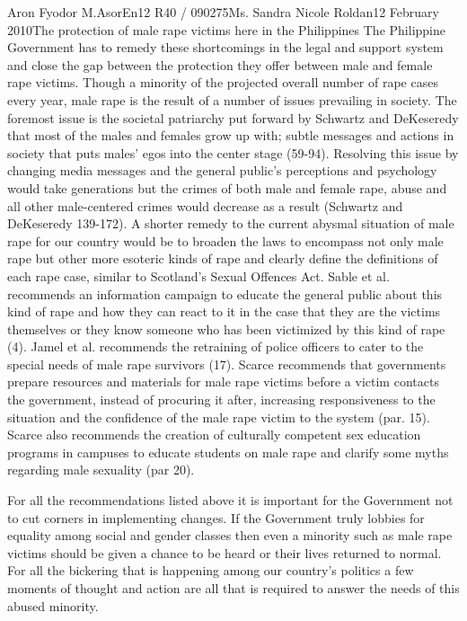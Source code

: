 \documentclass[12pt,letterpaper]{article}
\begin{document}
\begin{mla}{Aron Fyodor M.}{Asor}{En12 R40 / 090275}{Ms. Sandra Nicole Roldan}{12 February 2010}{The protection of male rape victims here in the Philippines}
\tab The Philippine Government has to remedy these shortcomings in the legal and support system and close the gap between the protection they offer between male and female rape victims. Though a minority of the projected overall number of rape cases every year, male rape is the result of a number of issues prevailing in society. The foremost issue is the societal patriarchy put forward by Schwartz and DeKeseredy that most of the males and females grow up with; subtle messages and actions in society that puts males' egos into the center stage (59-94). Resolving this issue by changing media messages and the general public's perceptions and psychology would take generations but the crimes of both male and female rape, abuse and all other male-centered crimes would decrease as a result (Schwartz and DeKeseredy 139-172). A shorter remedy to the current abysmal situation of male rape for our country would be to broaden the laws to encompass not only male rape but other more esoteric kinds of rape and clearly define the definitions of each rape case, similar to Scotland's Sexual Offences Act. Sable et al. recommends an information campaign to educate the general public about this kind of rape and how they can react to it in the case that they are the victims themselves or they know someone who has been victimized by this kind of rape (4). Jamel et al. recommends the retraining of police officers to cater to the special needs of male rape survivors (17). Scarce recommends that governments prepare resources and materials for male rape victims before a victim contacts the government, instead of procuring it after, increasing responsiveness to the situation and the confidence of the male rape victim to the system (par. 15). Scarce also recommends the creation of culturally competent sex education programs in campuses to educate students on male rape and clarify some myths regarding male sexuality (par 20).

For all the recommendations listed above it is important for the Government not to cut corners in implementing changes. If the Government truly lobbies for equality among social and gender classes then even a minority such as male rape victims should be given a chance to be heard or their lives returned to normal. For all the bickering that is happening among our country's politics a few moments of thought and action are all that is required to answer the needs of this abused minority.









\end{mla}
\end{document}
